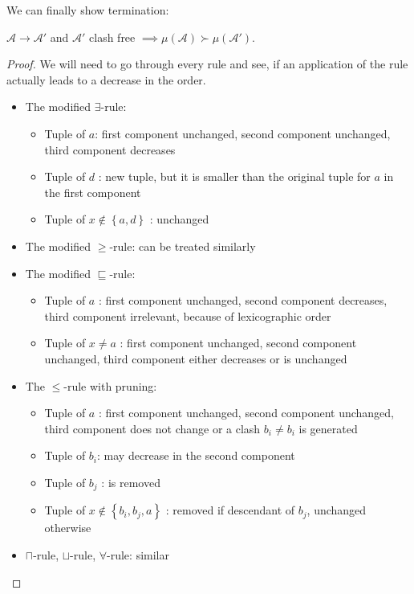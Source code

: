 We can finally show termination:
\begin{lemma}\label{lem:implication_multiset_order}
	$\mathcal{A} \to \mathcal{A}'$ and $\mathcal{A}'$ clash free $ \implies \mu(\mathcal{A}) \succ \mu(\mathcal{A}')$.
\end{lemma}
\begin{proof}
	We will need to go through every rule and see, if an application of the rule actually leads to a  decrease in the order. 
	\begin{itemize}
		\item The modified $\exists$-rule:
			\begin{itemize}
				\item Tuple of $a$: first component unchanged,
					second component unchanged,
					third component decreases
				\item Tuple of $d$ : new tuple, but it is smaller than the original tuple for $a$ in the first component
				\item Tuple of $x \notin \left\{ a,d \right\}$ : unchanged
			\end{itemize}
		\item The modified $ \geq$-rule: can be treated similarly
		\item The modified $\sqsubseteq$-rule:
			\begin{itemize}
				\item Tuple of $a$ : first component unchanged,
					second component decreases,
					third component irrelevant, because of lexicographic order
				\item Tuple of $x \neq a$ : first component unchanged,
					second component unchanged,
					third component either decreases or is unchanged
			\end{itemize}
		\item The $ \leq$-rule with pruning:
			\begin{itemize}
				\item Tuple of $a$ : first component unchanged,
					second component unchanged,
					third component does not change or a clash $b_i \neq b_i$ is generated
				\item Tuple of $b_i$: may decrease in the second component
				\item Tuple of $b_j$ : is removed
				\item Tuple of $x \notin \left\{ b_i, b_j, a \right\}$ :
					removed if descendant of $b_j$,
					unchanged otherwise
			\end{itemize}
		\item $\sqcap$-rule, $\sqcup$-rule, $\forall$-rule: similar
		\qedhere
	\end{itemize}
\end{proof}
